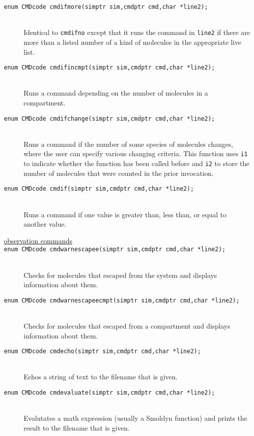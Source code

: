 \documentclass {scrbook}
\newcommand {\ttt} {\texttt}
\begin{document}
\begin{description}
\item[\ttt{enum CMDcode cmdifmore(simptr sim,cmdptr cmd,char *line2);}]
\hfill \\
Identical to \ttt{cmdifno} except that it runs the command in \ttt{line2} if there are more than a listed number of a kind of molecules in the appropriate live list.

\item[\ttt{enum CMDcode cmdifincmpt(simptr sim,cmdptr cmd,char *line2);}]
\hfill \\
Runs a command depending on the number of molecules in a compartment.

\item[\ttt{enum CMDcode cmdifchange(simptr sim,cmdptr cmd,char *line2);}]
\hfill \\
Runs a command if the number of some species of molecules changes, where the user can specify various changing criteria. This function uses \ttt{i1} to indicate whether the function has been called before and \ttt{i2} to store the number of molecules that were counted in the prior invocation.

\item[\ttt{enum CMDcode cmdif(simptr sim,cmdptr cmd,char *line2);}]
\hfill \\
Runs a command if one value is greater than, less than, or equal to another value.

\item[\underline{observation commands}]

\item[\ttt{enum CMDcode cmdwarnescapee(simptr sim,cmdptr cmd,char *line2);}]
\hfill \\
Checks for molecules that escaped from the system and displays information about them.

\item[\ttt{enum CMDcode cmdwarnescapeecmpt(simptr sim,cmdptr cmd,char *line2);}]
\hfill \\
Checks for molecules that escaped from a compartment and displays information about them.

\item[\ttt{enum CMDcode cmdecho(simptr sim,cmdptr cmd,char *line2);}]
\hfill \\
Echos a string of text to the filename that is given.

\item[\ttt{enum CMDcode cmdevaluate(simptr sim,cmdptr cmd,char *line2);}]
\hfill \\
Evalutates a math expression (usually a Smoldyn function) and prints the result to the filename that is given.


\end{description}
\end{document}
